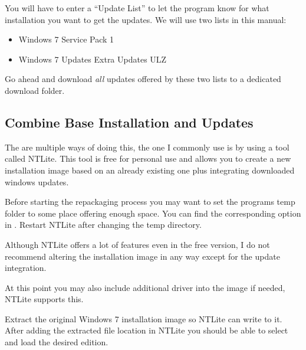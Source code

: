 \documentclass{itsarticle}
\begin{document}

You will have to enter a ``Update List'' to let the program know for what
installation you want to get the updates. We will use two lists in this manual:

\begin{itemize}
    \item Windows 7 Service Pack 1\footnotemark
    \item Windows 7 Updates Extra Updates ULZ\footnotemark
\end{itemize}


Go ahead and download \emph{all} updates offered by these two lists to a
dedicated download folder.

\subsection{Combine Base Installation and Updates}
\label{ssec:ntlite}

The are multiple ways of doing this, the one I commonly use is by using a tool
called NTLite\footnotemark. This tool is free for personal use and allows you
to create a new installation image based on an already existing one plus
integrating downloaded windows updates.


Before starting the repackaging process you may want to set the programs temp
folder to some place offering enough space. You can find the corresponding
option in . Restart NTLite
after changing the temp directory.

Although NTLite offers a lot of features even in the free version, I do not
recommend altering the installation image in any way except for the update
integration.

At this point you may also include additional driver into the image if needed,
NTLite supports this.

Extract the original Windows 7 installation image so NTLite can write to it.
After adding the extracted file location in NTLite you should be able to select
and load the desired edition.
\end{document}
